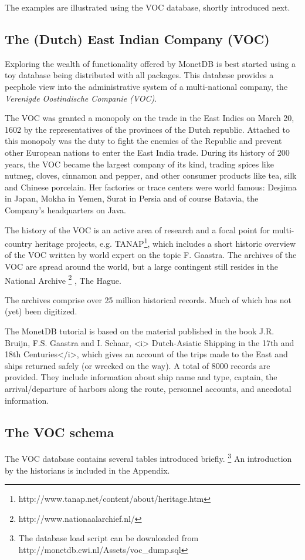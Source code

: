 \documentclass[10pt,twocolumn,fleqn]{article}
\begin{document}
The examples are illustrated using the VOC database, shortly introduced
next.
\subsection{The (Dutch) East Indian Company (VOC)}
Exploring the wealth of functionality offered by MonetDB is best
started using a toy database being distributed with all packages.
This database provides a peephole view into the administrative
system of a multi-national company, the {\em Verenigde Oostindische Companie (VOC)}.

The VOC was granted a monopoly on the trade in the East Indies on March 20, 1602
by the representatives of the provinces of the Dutch republic.
Attached to this monopoly was the duty to fight the enemies of the Republic and 
prevent other European nations to enter the East India trade.
During its history of 200 years, the VOC became the largest company of its kind, 
trading spices like nutmeg, cloves, cinnamon and pepper, and other consumer 
products like tea, silk and Chinese porcelain.
Her factories or trace centers were world famous: Desjima in Japan, 
Mokha in Yemen, Surat in Persia and of course Batavia, 
the Company's headquarters on Java.

The history of the VOC is an active area of research and
a focal point for multi-country heritage projects, e.g. 
TANAP\footnote{http://www.tanap.net/content/about/heritage.htm},
which includes a short historic overview of the VOC written by
world expert on the topic F. Gaastra.
The archives of the VOC are spread around the world, but a large
contingent still resides in the 
National Archive
\footnote{ http://www.nationaalarchief.nl/ }
, The Hague.

The archives comprise over 25 million historical records.
Much of which has not (yet) been digitized.

The MonetDB tutorial is based on the material published in the book 
J.R. Bruijn, F.S. Gaastra and I. Schaar, <i> Dutch-Asiatic Shipping in the 17th and 18th Centuries</i>, which
gives an account of the trips made to the East and ships returned safely
(or wrecked on the way). A total of 8000 records are provided. 
They include information about ship name and type, captain,
the arrival/departure of harbors along the route, personnel accounts, 
and anecdotal information.

\subsection{The VOC schema}
The VOC database contains several tables introduced briefly.
\footnote{The database load script can be downloaded from http://monetdb.cwi.nl/Assets/voc\_dump.sql}
An introduction by the historians is included in the Appendix.
\end{document}
